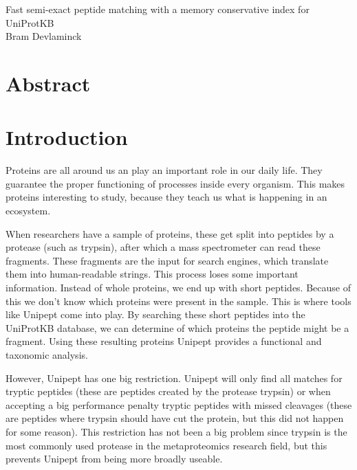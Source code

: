 \documentclass[11pt]{article}
\begin{document}
    \begingroup
    \centering
    \LARGE Fast semi-exact peptide matching with a memory conservative index for UniProtKB\\[1em]
    \large Bram Devlaminck\\[2em]
    \endgroup

    \begin{multicols}{2}
        \section*{Abstract}\label{sec:test-section}


        \section{Introduction}\label{sec:introduction}
        Proteins are all around us an play an important role in our daily life.
        They guarantee the proper functioning of processes inside every organism.
        This makes proteins interesting to study, because they teach us what is happening in an ecosystem.

        When researchers have a sample of proteins, these get split into peptides by a protease (such as trypsin), after which a mass spectrometer can read these fragments.
        These fragments are the input for search engines, which translate them into human-readable strings.
        This process loses some important information.
        Instead of whole proteins, we end up with short peptides.
        Because of this we don't know which proteins were present in the sample.
        This is where tools like Unipept come into play.
        By searching these short peptides into the UniProtKB database, we can determine of which proteins the peptide might be a fragment.
        Using these resulting proteins Unipept provides a functional and taxonomic analysis.

        However, Unipept has one big restriction.
        Unipept will only find all matches for tryptic peptides (these are peptides created by the protease trypsin) or when accepting a big performance penalty tryptic peptides with missed cleavages (these are peptides where trypsin should have cut the protein, but this did not happen for some reason).
        This restriction has not been a big problem since trypsin is the most commonly used protease in the metaproteomics research field, but this prevents Unipept from being more broadly useable.


\end{multicols}
\end{document}
